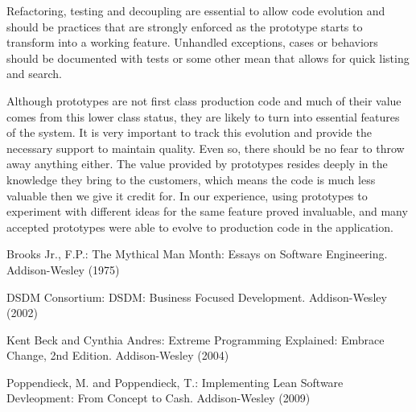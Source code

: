 \documentclass[lnbip]{svmultln}
\begin{document}
Refactoring, testing and decoupling are essential to allow code
evolution and should be practices that are strongly enforced as the
prototype starts to transform into a working feature.  Unhandled
exceptions, cases or behaviors should be documented with tests or some
other mean that allows for quick listing and search.

Although prototypes are not first class production code and much of
their value comes from this lower class status, they are likely to
turn into essential features of the system. It is very important to
track this evolution and provide the necessary support to maintain
quality. Even so, there should be no fear to throw away anything
either.  The value provided by prototypes resides deeply in the
knowledge they bring to the customers, which means the code is much
less valuable then we give it credit for. In our experience, using
prototypes to experiment with different ideas for the same feature
proved invaluable, and many accepted prototypes were able to evolve to
production code in the application.

%
%
\begin{thebibliography}{5}

 Brooks Jr., F.P.: The Mythical Man Month: Essays
  on Software Engineering. Addison-Wesley (1975)

 DSDM Consortium: DSDM: Business Focused
  Development. Addison-Wesley (2002)
  
 Kent Beck and Cynthia Andres: Extreme Programming
  Explained: Embrace Change, 2nd Edition. Addison-Wesley (2004)




 Poppendieck, M. and Poppendieck, T.:
  Implementing Lean Software Devleopment: From Concept to
  Cash. Addison-Wesley (2009)

\end{thebibliography}
%
\end{document}
